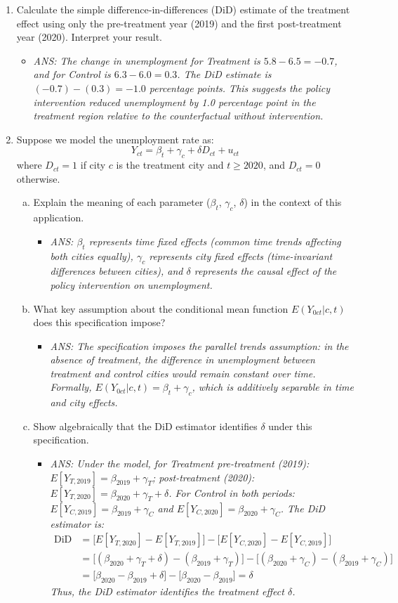 \documentclass[12pt,a4paper]{article}
\newcommand{\ans}[1]{\begin{itemize}\item[$\bullet$] \textit{ANS: #1}\end{itemize}}
\begin{document}
\begin{enumerate}
\item Calculate the simple difference-in-differences (DiD) estimate of the treatment effect using only the pre-treatment year (2019) and the first post-treatment year (2020). Interpret your result.
\ans{The change in unemployment for Treatment is $5.8-6.5=-0.7$, and for Control is $6.3-6.0=0.3$. The DiD estimate is $(-0.7)-(0.3)=-1.0$ percentage points. This suggests the policy intervention reduced unemployment by 1.0 percentage point in the treatment region relative to the counterfactual without intervention.}

\item Suppose we model the unemployment rate as:
\begin{equation}
\label{eq:did}
Y_{ct}=\beta_{t}+\gamma_{c}+\delta D_{ct}+u_{ct}
\end{equation}
where $D_{ct}=1$ if city $c$ is the treatment city and $t \geq 2020$, and $D_{ct}=0$ otherwise.
\begin{enumerate}[(a)]
\item Explain the meaning of each parameter ($\beta_{t}$, $\gamma_{c}$, $\delta$) in the context of this application.
\ans{$\beta_{t}$ represents time fixed effects (common time trends affecting both cities equally), $\gamma_{c}$ represents city fixed effects (time-invariant differences between cities), and $\delta$ represents the causal effect of the policy intervention on unemployment.}

\item What key assumption about the conditional mean function $E(Y_{0ct}|c,t)$ does this specification impose?
\ans{The specification imposes the parallel trends assumption: in the absence of treatment, the difference in unemployment between treatment and control cities would remain constant over time. Formally, $E(Y_{0ct}|c,t)=\beta_{t}+\gamma_{c}$, which is additively separable in time and city effects.}

\item Show algebraically that the DiD estimator identifies $\delta$ under this specification.
\ans{Under the model, for Treatment pre-treatment (2019): $E[Y_{T,2019}]=\beta_{2019}+\gamma_{T}$; post-treatment (2020): $E[Y_{T,2020}]=\beta_{2020}+\gamma_{T}+\delta$. For Control in both periods: $E[Y_{C,2019}]=\beta_{2019}+\gamma_{C}$ and $E[Y_{C,2020}]=\beta_{2020}+\gamma_{C}$. The DiD estimator is:
\begin{align*}
\text{DiD} &= \big[E[Y_{T,2020}]-E[Y_{T,2019}]\big]-\big[E[Y_{C,2020}]-E[Y_{C,2019}]\big]\\
&= \big[(\beta_{2020}+\gamma_{T}+\delta)-(\beta_{2019}+\gamma_{T})\big]-\big[(\beta_{2020}+\gamma_{C})-(\beta_{2019}+\gamma_{C})\big]\\
&= \big[\beta_{2020}-\beta_{2019}+\delta\big]-\big[\beta_{2020}-\beta_{2019}\big]=\delta
\end{align*}
Thus, the DiD estimator identifies the treatment effect $\delta$.}
\end{enumerate}


\end{enumerate}
\end{document}
